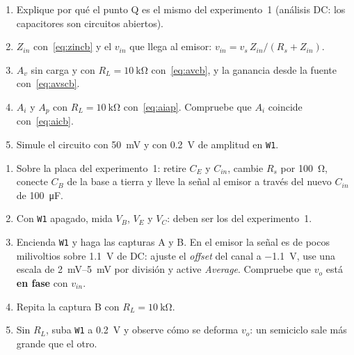 \documentclass[11pt,a4paper]{article}
\begin{document}
\begin{enumerate}[label=\alph*), leftmargin=*, itemsep=3pt]
  \item Explique por qué el punto Q es el mismo del experimento~1 (análisis DC: los
        capacitores son circuitos abiertos).
  \item $Z_{in}$ con~\eqref{eq:zincb} y el $v_{in}$ que llega al emisor:
        $v_{in} = v_s\,Z_{in}/(R_s + Z_{in})$.
  \item $A_v$ sin carga y con $R_L = \qty{10}{\kilo\ohm}$ con~\eqref{eq:avcb}, y la ganancia
        desde la fuente con~\eqref{eq:avscb}.
  \item $A_i$ y $A_p$ con $R_L = \qty{10}{\kilo\ohm}$ con~\eqref{eq:aiap}. Compruebe que $A_i$
        coincide con~\eqref{eq:aicb}.
  \item Simule el circuito con \qty{50}{\milli\volt} y con \qty{0.2}{\volt} de amplitud en
        \texttt{W1}.
\end{enumerate}

\begin{enumerate}[label=\alph*), ref=\alph*, leftmargin=*, itemsep=3pt]
  \item Sobre la placa del experimento~1: retire $C_E$ y $C_{in}$, cambie $R_s$ por
        \qty{100}{\ohm}, conecte $C_B$ de la base a tierra y lleve la señal al emisor a través
        del nuevo $C_{in}$ de \qty{100}{\micro\farad}.
  \item Con \texttt{W1} apagado, mida $V_B$, $V_E$ y $V_C$: deben ser los del experimento~1.
  \item \label{paso:cbmed}Encienda \texttt{W1} y haga las capturas A y B. En el emisor la señal
        es de pocos milivoltios sobre \qty{1.1}{\volt} de DC: ajuste el \emph{offset} del canal
        a \qty{-1.1}{\volt}, use una escala de \qtyrange{2}{5}{\milli\volt} por división y
        active \emph{Average}. Compruebe que $v_o$ está \textbf{en fase} con $v_{in}$.
  \item Repita la captura B con $R_L = \qty{10}{\kilo\ohm}$.
  \item \label{paso:cbdist}Sin $R_L$, suba \texttt{W1} a \qty{0.2}{\volt} y observe cómo se
        deforma $v_o$: un semiciclo sale más grande que el otro.
\end{enumerate}
\end{document}
